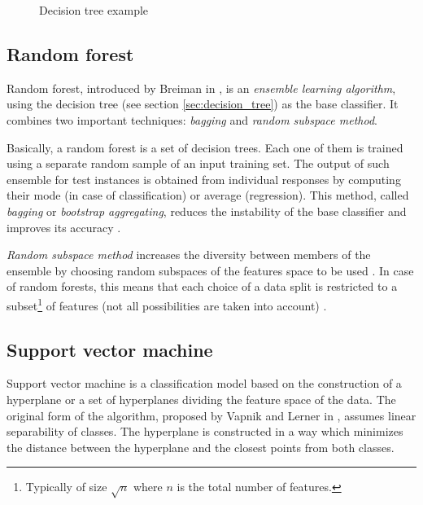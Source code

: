 \documentclass{pracamgr}
\begin{document}
\begin{figure}[h]
\centering

\caption[Decision tree example]{Decision tree example\footnotemark}
\label{fig:decision_tree}
\end{figure}

\subsection{Random forest}
\label{sec:random_forest}

Random forest, introduced by Breiman in \cite{random_forests}, is an \emph{ensemble learning algorithm}, using the decision tree (see section \ref{sec:decision_tree}) as the base classifier. It combines two important techniques: \emph{bagging} and \emph{random subspace method}.

Basically, a random forest is a set of decision trees. Each one of them is trained using a separate random sample of an input training set. The output of such ensemble for test instances is obtained from individual responses by computing their mode (in case of classification) or average (regression). This method, called \emph{bagging} or \emph{bootstrap aggregating}, reduces the instability of the base classifier and improves its accuracy \cite{bagging}.

\emph{Random subspace method} increases the diversity between members of the ensemble by choosing random subspaces of the features space to be used \cite[p.~828]{encyclopedia}. In case of random forests, this means that each choice of a data split is restricted to a subset\footnote{Typically of size $\sqrt{n}$ where $n$ is the total number of features.} of features (not all possibilities are taken into account) \cite{random_forests}.
 
\subsection{Support vector machine}
\label{sec:svm}
Support vector machine is a classification model based on the construction of a hyperplane or a set of hyperplanes dividing the feature space of the data. The original form of the algorithm, proposed by Vapnik and Lerner in \cite{svm}, assumes linear separability of classes. The hyperplane is constructed in a way which minimizes the distance between the hyperplane and the closest points from both classes.
\end{document}
